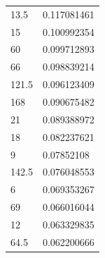 \begin{longtable}{|l|l|}
 \rowcolor[HTML]{32CB00} 
 13.5                                                    & 0.117081461                                                   \\
 \rowcolor[HTML]{32CB00} 
 15                                                      & 0.100992354                                                   \\
 \rowcolor[HTML]{32CB00} 
 60                                                      & 0.099712893                                                   \\
 \rowcolor[HTML]{32CB00} 
 66                                                      & 0.098839214                                                   \\
 \rowcolor[HTML]{32CB00} 
 121.5                                                   & 0.096123409                                                   \\
 \rowcolor[HTML]{32CB00} 
 168                                                     & 0.090675482                                                   \\
 \rowcolor[HTML]{32CB00} 
 21                                                      & 0.089388972                                                   \\
 \rowcolor[HTML]{32CB00} 
 18                                                      & 0.082237621                                                   \\
 \rowcolor[HTML]{32CB00} 
 9                                                       & 0.07852108                                                    \\
 \rowcolor[HTML]{32CB00} 
 142.5                                                   & 0.076048553                                                   \\
 \rowcolor[HTML]{32CB00} 
 6                                                       & 0.069353267                                                   \\
 \rowcolor[HTML]{32CB00} 
 69                                                      & 0.066016044                                                   \\
 \rowcolor[HTML]{32CB00} 
 12                                                      & 0.063329835                                                   \\
 \rowcolor[HTML]{32CB00} 
 64.5                                                    & 0.062200666                                                   \\

\end{longtable}
